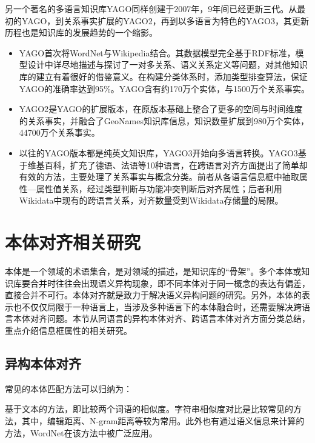 另一个著名的多语言知识库YAGO同样创建于2007年，9年间已经更新三代。从最初的YAGO\cite{suchanek2007yago,suchanek2008yago}，到关系事实扩展的YAGO2\cite{hoffart2013yago2}，再到以多语言为特色的YAGO3\cite{mahdisoltani2014yago3}，其更新历程也是知识库的发展趋势的一个缩影。
\begin{itemize}
  \item {\heiti YAGO}首次将WordNet\cite{fellbaum1998wordnet}与Wikipedia结合。其数据模型完全基于RDF标准，模型设计中详尽地描述与探讨了一对多关系、语义关系定义等问题，对其他知识库的建立有着很好的借鉴意义。在构建分类体系时，添加类型排查算法，保证YAGO的准确率达到95\%。YAGO含有约170万个实体，与1500万个关系事实。
  \item {\heiti YAGO2}是YAGO的扩展版本，在原版本基础上整合了更多的空间与时间维度的关系事实，并融合了GeoNames知识库信息，知识数量扩展到980万个实体，44700万个关系事实。
  \item 以往的YAGO版本都是纯英文知识库，{\heiti YAGO3}开始向多语言转换。YAGO3基于维基百科，扩充了德语、法语等10种语言，在跨语言对齐方面提出了简单却有效的方法，主要处理了关系事实与概念分类。前者从各语言信息框中抽取属性—属性值关系，经过类型判断与功能冲突判断后对齐属性；后者利用Wikidata中现有的跨语言关系，对齐数量受到Wikidata存储量的局限。
\end{itemize}

\section{本体对齐相关研究}
\label{sec:ontology-research}

本体是一个领域的术语集合，是对领域的描述，是知识库的“骨架”。多个本体或知识库要合并时往往会出现{\heiti 语义异构}现象，即不同本体对于同一概念的表达有偏差，直接合并不可行。本体对齐就是致力于解决语义异构问题的研究。另外，本体的表示也不仅仅局限于一种语言上，当涉及多种语言下的本体融合时，还需要解决跨语言本体对齐问题。本节从同语言的异构本体对齐、跨语言本体对齐方面分类总结，重点介绍信息框属性的相关研究。

\subsection{异构本体对齐}
常见的本体匹配方法可以归纳为：

{\heiti 基于文本的方法}，即比较两个词语的相似度。字符串相似度对比是比较常见的方法，其中，编辑距离、N-gram距离等较为常用。此外也有通过语义信息来计算的方法，WordNet\cite{miller1995wordnet}在该方法中被广泛应用。

